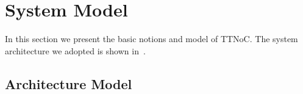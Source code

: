 \documentclass[journal]{IEEEtran}
\theoremstyle{remark}
\begin{document}
%



\section{System Model}
\label{s:model}

In this section we present the basic notions and model of TTNoC.
The system architecture we adopted is shown in~\cite{DBLP:conf/rtcsa/PaukovitsK08}. 

\subsection{Architecture Model}
\end{document}
